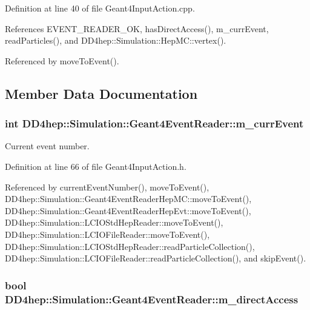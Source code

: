 Definition at line 40 of file Geant4InputAction.cpp.

References EVENT\_\-READER\_\-OK, hasDirectAccess(), m\_\-currEvent, readParticles(), and DD4hep::Simulation::HepMC::vertex().

Referenced by moveToEvent().

\subsection{Member Data Documentation}
\hypertarget{class_d_d4hep_1_1_simulation_1_1_geant4_event_reader_a3f1446121fae285cd2772ca9bd1d8af3}{
\subsubsection[{m\_\-currEvent}]{\setlength{\rightskip}{0pt plus 5cm}int {\bf DD4hep::Simulation::Geant4EventReader::m\_\-currEvent}}}
\label{class_d_d4hep_1_1_simulation_1_1_geant4_event_reader_a3f1446121fae285cd2772ca9bd1d8af3}


Current event number. 

Definition at line 66 of file Geant4InputAction.h.

Referenced by currentEventNumber(), moveToEvent(), DD4hep::Simulation::Geant4EventReaderHepMC::moveToEvent(), DD4hep::Simulation::Geant4EventReaderHepEvt::moveToEvent(), DD4hep::Simulation::LCIOStdHepReader::moveToEvent(), DD4hep::Simulation::LCIOFileReader::moveToEvent(), DD4hep::Simulation::LCIOStdHepReader::readParticleCollection(), DD4hep::Simulation::LCIOFileReader::readParticleCollection(), and skipEvent().\hypertarget{class_d_d4hep_1_1_simulation_1_1_geant4_event_reader_a1902827774d01fd87f38cbee29696fe0}{
\subsubsection[{m\_\-directAccess}]{\setlength{\rightskip}{0pt plus 5cm}bool {\bf DD4hep::Simulation::Geant4EventReader::m\_\-directAccess}}}
\label{class_d_d4hep_1_1_simulation_1_1_geant4_event_reader_a1902827774d01fd87f38cbee29696fe0}


